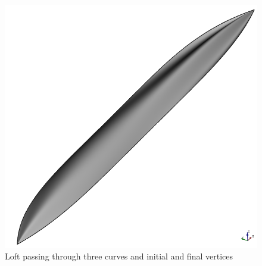 %
%
\begin{figure}[!ht]
\centering
\includegraphics[scale=0.6]{Immagini/Capitolo2/ShellExample32}
\caption{Loft passing through three curves and initial and final vertices}
\label{fig:ShellExample3}
\end{figure}
%